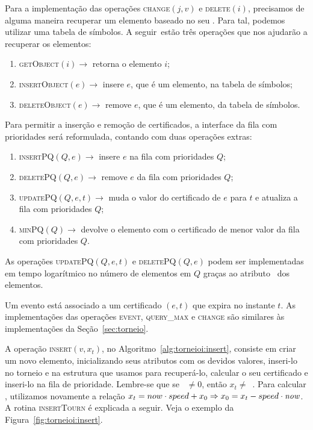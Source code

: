 Para a implementação das operações \textsc{change}$(j, v)$ e \textsc{delete}$(i)$, precisamos de
alguma maneira recuperar um elemento baseado no seu \id.
Para tal, podemos utilizar uma tabela de símbolos.
A seguir~estão três operações que nos ajudarão a recuperar os elementos:
\begin{enumerate}
    \item \textsc{getObject}$(i)\rightarrow$ retorna o elemento $i$;
    \item \textsc{insertObject}$(e) \rightarrow$ insere $e$, que é
    um elemento, na tabela de símbolos;
    \item \textsc{deleteObject}$(e) \rightarrow$ remove $e$, que é
    um elemento, da tabela de símbolos.
\end{enumerate}
Para permitir a inserção e remoção de certificados, a interface da fila com prioridades será
reformulada, contando com duas operações extras:
\begin{enumerate}
    \item \textsc{insertPQ}$(Q, e) \rightarrow$ insere $e$ na fila
    com prioridades $Q$;
    \item \textsc{deletePQ}$(Q, e) \rightarrow$ remove $e$ da fila
    com prioridades $Q$;
    \item \textsc{updatePQ}$(Q,e,t) \rightarrow$ muda o valor do
    certificado de $e$ para $t$ e atualiza a fila com prioridades
    $Q$;
    \item \textsc{minPQ}$(Q) \rightarrow$ devolve o elemento com o
    certificado de menor valor da fila com prioridades $Q$.
\end{enumerate}
As operações \textsc{updatePQ}$(Q,e,t)$ e \textsc{deletePQ}$(Q, e)$ podem ser implementadas em
tempo logarítmico no número de elementos em $Q$ graças ao atributo \pqpos~dos elementos.

Um evento está associado a um certificado $(e, t)$ que expira no instante $t$.
As implementações das operações \textsc{event}, \textsc{query\_max} e \textsc{change} são
similares às implementações da Seção~\ref{sec:torneio}.



A operação \textsc{insert}$(v, x_t)$, no Algoritmo~\ref{alg:torneioi:insert}, consiste em criar um
novo elemento, inicializando seus atributos com os devidos valores, inseri-lo no torneio e na
estrutura que usamos para recuperá-lo, calcular o seu certificado e inseri-lo na fila de
prioridade.
Lembre-se que se \now~$\neq 0$, então $x_t \neq$~\initv.
Para calcular \initv, utilizamos novamente a relação $x_t = now\cdot speed + x_0 \Rightarrow x_0 =
x_t - speed\cdot\textit{now}$.
A rotina \textsc{insertTourn} é explicada a seguir.
Veja o exemplo da Figura~\ref{fig:torneioi:insert}.

